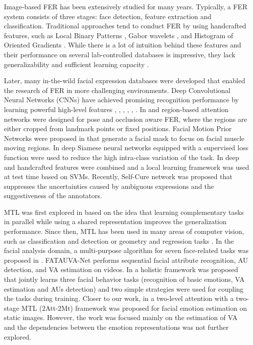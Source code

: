 \documentclass[a4paper, 10pt, conference]{ieeeconf}      \usepackage{FG2021}
\begin{document}
Image-based FER has been extensively studied for many years. Typically, a FER system consists of three stages: face detection, feature extraction and classification. Traditional approaches tend to conduct FER by using handcrafted features, such as Local Binary Patterns \cite{shan2009facial}, Gabor wavelets \cite{liu2002gabor}, \cite{moore2011local} and Histogram of Oriented Gradients \cite{carcagni2015facial}. While there is a lot of intuition behind these features and their performance on several lab-controlled databases is impressive, they lack generalizability and sufficient learning capacity \cite{li2020deep}. 

Later, many in-the-wild facial expression databases were developed that enabled the research of FER in more challenging environments. Deep Convolutional Neural Networks (CNNs) have achieved promising recognition performance by learning powerful high-level features \cite{zeng2018facial}, \cite{ding2017facenet2expnet}, \cite{yu2015image}, \cite{kim2015hierarchical}, \cite{hasani2020breg}, \cite{ding2020occlusion}. In \cite{li2018occlusion} and \cite{wang2020region} region-based attention networks were designed for pose and occlusion aware FER, where the regions are either cropped from landmark points or fixed positions. Facial Motion Prior Networks were proposed in \cite{chen2019facial} that generate a facial mask to focus on facial muscle moving regions. In \cite{hayale2019facial} deep Siamese neural networks equipped with a supervised loss function were used to reduce the high intra-class variation of the task. In \cite{georgescu2019local} deep and handcrafted features were combined and a local learning framework was used at test time based on SVMs. Recently, Self-Cure network \cite{wang2020suppressing} was proposed that suppresses the uncertainties caused by ambiguous expressions and the suggestiveness of the annotators.

MTL was first explored in \cite{caruana1997multitask} based on the idea that learning complementary tasks in parallel while using a shared representation improves the generalization performance. Since then, MTL has been used in many areas of computer vision, such as classification and detection \cite{sermanet2013overfeat} or geometry and regression tasks \cite{eigen2015predicting}. In the facial analysis domain, a multi-purpose algorithm for seven face-related tasks was proposed in \cite{ranjan2017all}. FATAUVA-Net \cite{chang2017fatauva} performs sequential facial attribute recognition, AU detection, and VA estimation on videos. In \cite{kollias2019expression} a holistic framework was proposed that jointly learns three facial behavior tasks (recognition of basic emotions, VA estimation and AUs detection) and two simple strategies were used for coupling the tasks during training. Closer to our work, in \cite{xiaohua2019two} a two-level attention with a two-stage MTL (2Att-2Mt) framework was proposed for facial emotion estimation on static images. However, the work was focused mainly on the estimation of VA and the dependencies between the emotion representations was not further explored. 
\end{document}
